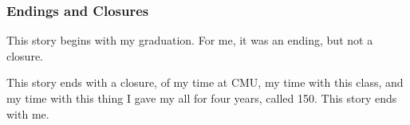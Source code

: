 \documentclass[aspectratio=169, handout]{beamer}
\begin{document}
\begin{frame}[fragile]
  \frametitle{Endings and Closures}

  This story begins with my graduation. For me, it was an ending, but not a
  closure.

  \pause
  \vspace{\fill}

  This story ends with a closure, of my time at CMU, my time with this class,
  and my time with this thing I gave my all for four years, called 150.
  This story ends with me.

  \begin{comment}
    See, I had COVID during my graduation. I never walked. I sat at home in
    my pajamas and watched my own graduation remotely, and I had my best friend
    walk across the stage with a cardboard cutout of me in my place.

    It was a good joke. But what I realized was that, that happened, and then
    I packed up my stuff and went home. I never saw CMU again until months later.
    I never got that sense of closure, the time to finally say goodbye to
    this school and everything that it had done for me.

    So this presentation isn't just my goodbye to you. It's my goodbye to CMU,
    it's my goodbye to 150, it's my goodbye to something which I have been
    with for the past four years of my life.

    And that's scary.
  \end{comment}
\end{frame}
\end{document}
